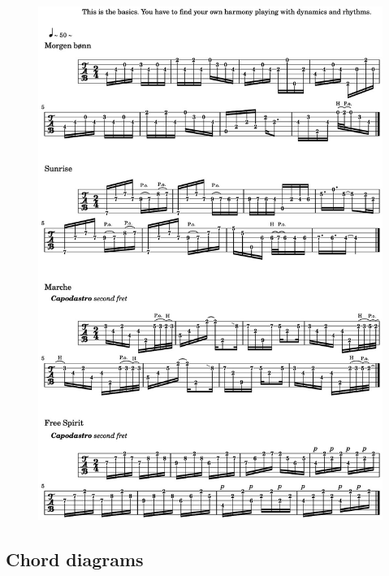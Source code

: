 \begin{figure}[H]
\begin{center}
\includegraphics[scale=0.23]{img/5573.jpg}
\end{center}
\end{figure}

\newpage
\subsection*{\quad Chord diagrams}
\label{kjcccc}

